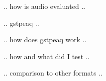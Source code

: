 .. how is audio evaluated ..

.. gstpeaq ..

.. how does gstpeaq work ..

.. how and what did I test ..

.. comparison to other formats ..
